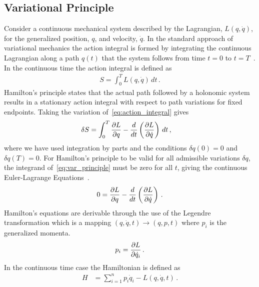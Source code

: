 \documentclass[preprint]{elsarticle}
\begin{document}
\subsection{Variational Principle}
Consider a continuous mechanical system described by the Lagrangian, \( L( q, \dot{q} ) \), for the generalized position, \( q\), and velocity, \( \dot{q} \).
In the standard approach of variational mechanics the action integral is formed by integrating the continuous Lagrangian along a path \( q(t) \) that the system follows from time \( t = 0 \) to \( t = T \)~\cite{greenwood1988}.
In the continuous time the action integral is defined as
\begin{align}\label{eq:action_integral}
	S = \int_{0}^T L\left( q, \dot{q}\right) \, dt \, .
\end{align}
Hamilton's principle states that the actual path followed by a holonomic system results in a stationary action integral with respect to path variations for fixed endpoints.
Taking the variation of~\cref{eq:action_integral} gives
\begin{align}\label{eq:var_principle}
	\delta S %
	&= \int_{0}^T \deriv{L}{q} - \frac{d}{dt} \left( \deriv{L}{\dot{q}}	\right) \, dt \, ,
\end{align}
where we have used integration by parts and the conditions \( \delta q(0) = 0 \) and \( \delta q(T) = 0\).
For Hamilton's principle to be valid for all admissible variations \( \delta q \), the integrand of~\cref{eq:var_principle} must be zero for all \( t\), giving the continuous Euler-Lagrange Equations~\cite{lanczos1970}.
\begin{align}\label{eq:euler-lagrange}
	0 = \frac{\partial L}{\partial q} - \frac{d}{dt} \left( \frac{\partial L}{\partial \dot{q}} \right) \, .
\end{align}
Hamilton's equations are derivable through the use of the Legendre transformation which is a mapping \( \left( q, \dot{q},t\right) \rightarrow \left(q, p, t \right) \) where \( p_i\) is the generalized momenta.
\begin{align}\label{eq:legendre_transform}
	p_i = \frac{\partial L}{\partial \dot{q}_i} \, .
\end{align}
In the continuous time case the Hamiltonian is defined as
\begin{align}\label{eq:hamiltonian}
	H &= \sum_{i = 1}^n p_i \dot{q}_i - L \left( q,\dot{q}, t \right) \, .
\end{align}
\end{document}

